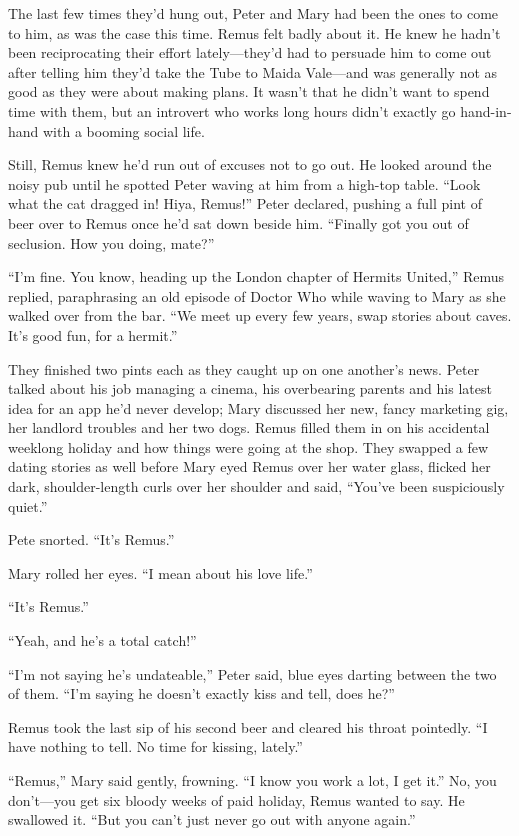 The last few times they’d hung out, Peter and Mary had been the ones to come to him, as was the case this time. Remus felt badly about it. He knew he hadn’t been reciprocating their effort lately—they’d had to persuade him to come out after telling him they’d take the Tube to Maida Vale—and was generally not as good as they were about making plans. It wasn’t that he didn’t want to spend time with them, but an introvert who works long hours didn’t exactly go hand-in-hand with a booming social life.

Still, Remus knew he’d run out of excuses not to go out. He looked around the noisy pub until he spotted Peter waving at him from a high-top table. “Look what the cat dragged in! Hiya, Remus!” Peter declared, pushing a full pint of beer over to Remus once he’d sat down beside him. “Finally got you out of seclusion. How you doing, mate?”

“I’m fine. You know, heading up the London chapter of Hermits United,” Remus replied, paraphrasing an old episode of Doctor Who while waving to Mary as she walked over from the bar. “We meet up every few years, swap stories about caves. It's good fun, for a hermit.”

They finished two pints each as they caught up on one another’s news. Peter talked about his job managing a cinema, his overbearing parents and his latest idea for an app he’d never develop; Mary discussed her new, fancy marketing gig, her landlord troubles and her two dogs. Remus filled them in on his accidental weeklong holiday and how things were going at the shop. They swapped a few dating stories as well before Mary eyed Remus over her water glass, flicked her dark, shoulder-length curls over her shoulder and said, “You’ve been suspiciously quiet.”

Pete snorted. “It’s Remus.”

Mary rolled her eyes. “I mean about his love life.”

“It’s Remus.”

“Yeah, and he’s a total catch!”

“I’m not saying he’s undateable,” Peter said, blue eyes darting between the two of them. “I’m saying he doesn’t exactly kiss and tell, does he?”

Remus took the last sip of his second beer and cleared his throat pointedly. “I have nothing to tell. No time for kissing, lately.”

“Remus,” Mary said gently, frowning. “I know you work a lot, I get it.” No, you don’t—you get six bloody weeks of paid holiday, Remus wanted to say. He swallowed it. “But you can’t just never go out with anyone again.”

